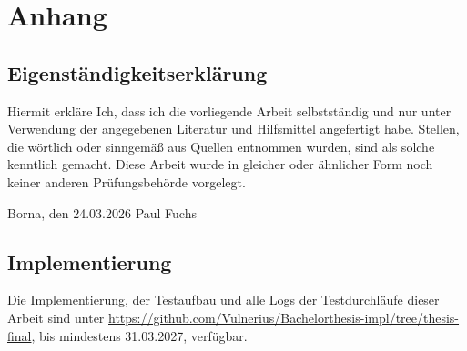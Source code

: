 \documentclass[
12pt,
a4paper,
twoside,
openright
]{report}
\begin{document}
	\clearpage	
	
	\printbibliography

	\appendix
	\chapter*{Anhang}
	\section*{Eigenständigkeitserklärung}
	Hiermit erkläre Ich, dass ich die vorliegende Arbeit selbstständig und nur unter Verwendung der angegebenen Literatur und Hilfsmittel angefertigt habe. Stellen, die wörtlich oder sinngemäß aus Quellen entnommen wurden, sind als solche kenntlich gemacht. Diese Arbeit wurde in gleicher oder ähnlicher Form noch keiner anderen Prüfungsbehörde vorgelegt.
	
	\vspace{2cm}
	
	\noindent
	\hfill
	\makebox[6cm]{\hrulefill}
	
	\noindent
	Borna, den 24.03.2026 	\hfill Paul Fuchs
	
	\clearpage
	\section*{Implementierung}
	Die Implementierung, der Testaufbau und alle Logs der Testdurchläufe dieser Arbeit sind unter \url{https://github.com/Vulnerius/Bachelorthesis-impl/tree/thesis-final}, bis mindestens 31.03.2027, verfügbar.
	
\end{document}
